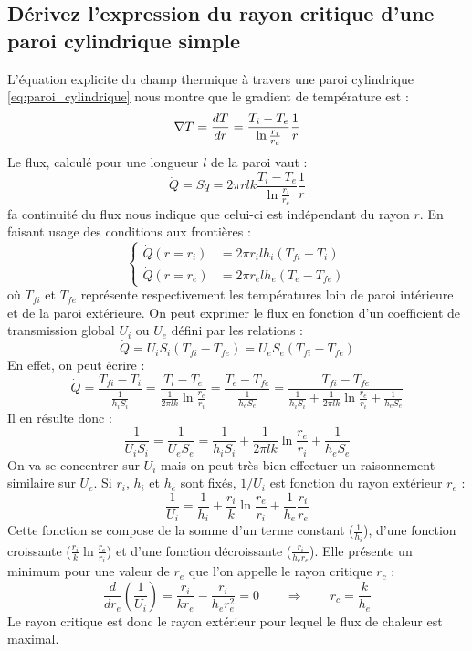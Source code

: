 \subsection{Dérivez l'expression du rayon critique d'une paroi cylindrique simple}
L'équation explicite du champ thermique à travers une paroi cylindrique \ref{eq:paroi_cylindrique} nous montre que le gradient de température est :
\begin{equation} \nabla T = \frac{dT}{dr} = \frac{T_i-T_e}{\ln\frac{r_i}{r_e}}\frac{1}{r} \end{equation}
Le flux, calculé pour une longueur $l$ de la paroi vaut :
\begin{equation} \dot{Q} = S\dot{q} = 2\pi rlk\frac{T_i-T_e}{\ln\frac{r_i}{r_e}}\frac{1}{r} \end{equation}
fa continuité du flux nous indique que celui-ci est indépendant du rayon $r$. En faisant usage des conditions aux frontières :
\begin{equation} \begin{cases} \dot{Q}(r=r_i) &= 2\pi r_ilh_i(T_{fi}-T_i) \\ \dot{Q}(r=r_e) &= 2\pi r_elh_e(T_e-T_{fe}) \end{cases} \end{equation}
où $T_{fi}$ et $T_{fe}$ représente respectivement les températures loin de paroi intérieure et de la paroi extérieure.
On peut exprimer le flux en fonction d'un coefficient de transmission global $U_i$ ou $U_e$ défini par les relations :
\begin{equation} \dot{Q} = U_iS_i(T_{fi}-T_{fe}) = U_eS_e(T_{fi}-T_{fe}) \end{equation}
En effet, on peut écrire :
\begin{equation} \dot{Q} = \frac{T_{fi}-T_i}{\frac{1}{h_iS_i}} = \frac{T_i-T_e}{\frac{1}{2\pi lk}\ln\frac{r_e}{r_i}} = \frac{T_e - T_{fe}}{\frac{1}{h_eS_e}} = \frac{T_{fi}-T_{fe}}{\frac{1}{h_iS_i} + \frac{1}{2\pi lk}\ln\frac{r_e}{r_i} + \frac{1}{h_eS_e}} \end{equation}
Il en résulte donc :
\begin{equation} \frac{1}{U_iS_i} = \frac{1}{U_eS_e} = \frac{1}{h_iS_i} + \frac{1}{2\pi lk}\ln\frac{r_e}{r_i} + \frac{1}{h_eS_e} \end{equation}
On va se concentrer sur $U_i$ mais on peut très bien effectuer un raisonnement similaire sur $U_e$. Si $r_i$, $h_i$ et $h_e$ sont fixés, $1/U_i$ est fonction du rayon extérieur $r_e$ :
\begin{equation} \frac{1}{U_i} = \frac{1}{h_i} + \frac{r_i}{k}\ln\frac{r_e}{r_i} + \frac{1}{h_e}\frac{r_i}{r_e} \end{equation}
Cette fonction se compose de la somme d'un terme constant ($\frac{1}{h_i}$), d'une fonction croissante ($\frac{r_i}{k}\ln\frac{r_e}{r_i}$) et d'une fonction décroissante ($\frac{r_i}{h_er_e}$). Elle présente un minimum pour une valeur de $r_e$ que l'on appelle le rayon critique $r_c$ :
\begin{equation} \frac{d}{dr_e}\left(\frac{1}{U_i}\right) = \frac{r_i}{kr_e} - \frac{r_i}{h_er_e^2} = 0 \qquad \Rightarrow \qquad r_c = \frac{k}{h_e} \end{equation}
Le rayon critique est donc le rayon extérieur pour lequel le flux de chaleur est maximal. 

